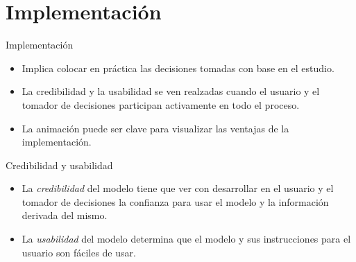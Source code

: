 \section{Implementación}

\frame{\sectionpage}

\begin{frame}{Implementación}
    \begin{itemize}
        \item Implica colocar en práctica las decisiones tomadas con base en el estudio.
        \item La credibilidad y la usabilidad se ven realzadas cuando el usuario y el tomador de decisiones participan activamente en todo el proceso.
        \item La animación puede ser clave para visualizar las ventajas de la implementación.
    \end{itemize}
\end{frame}


\begin{frame}{Credibilidad y usabilidad}
    \begin{itemize}
        \item La \textit{credibilidad} del modelo tiene que ver con desarrollar en el usuario y el tomador de decisiones la confianza para usar el modelo y la información derivada del mismo.
        \item La \textit{usabilidad} del modelo determina que el modelo y sus instrucciones para el usuario son fáciles de usar.
    \end{itemize}    
\end{frame}